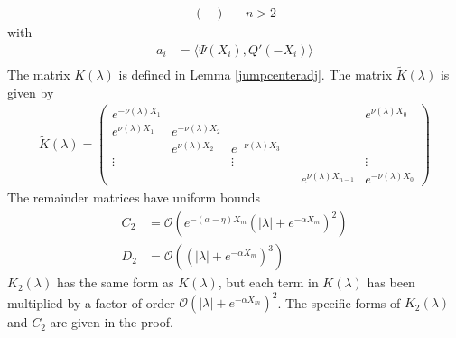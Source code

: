 \documentclass[thesis.tex]{subfiles}
\begin{document}
\begin{lemma}
\begin{align*}
\begin{pmatrix}
\end{pmatrix} && n > 2
\end{align*}
with
\begin{align*}
a_i &= \langle \Psi(X_i), Q'(-X_i) \rangle \\
\end{align*}
The matrix $K(\lambda)$ is defined in Lemma \ref{jumpcenteradj}. The matrix $\tilde{K}(\lambda)$ is given by
\begin{align*}
\tilde{K}(\lambda) =  
\begin{pmatrix}
e^{-\nu(\lambda)X_1} & & & & & e^{\nu(\lambda)X_0} \\
e^{\nu(\lambda)X_1} & e^{-\nu(\lambda)X_2} \\
& e^{\nu(\lambda)X_2} & e^{-\nu(\lambda)X_3} \\
\vdots & & \vdots & &&  \vdots \\
& & & & e^{\nu(\lambda)X_{n-1}} & e^{-\nu(\lambda)X_0} 
\end{pmatrix}
\end{align*}
The remainder matrices have uniform bounds
\begin{align*}
C_2 &= \mathcal{O}(e^{-(\alpha - \eta) X_m}(|\lambda| + e^{-\alpha X_m})^2) \\
D_2 &= \mathcal{O}((|\lambda| + e^{-\alpha X_m})^3)
\end{align*}
$K_2(\lambda)$ has the same form as $K(\lambda)$, but each term in $K(\lambda)$ has been multiplied by a factor of order $\mathcal{O}(|\lambda| + e^{-\alpha X_m})^2$. The specific forms of $K_2(\lambda)$ and $C_2$ are given in the proof.


\end{lemma}
\end{document}
